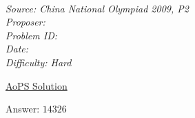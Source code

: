 \SSbreak\\
\emph{Source: China National Olympiad 2009, P2}\\
\emph{Proposer: \Pmatt}\\ %
\emph{Problem ID:}\\
\emph{Date: }\\
\emph{Difficulty: Hard}\\
\SSbreak

\bigskip

\begin{solution}\hfil\medskip
	
	\href{https://artofproblemsolving.com/community/c6h250256p1371288}{AoPS Solution} \medskip
	
	Answer: \(\boxed{14326}\)
\end{solution}\bigskip
